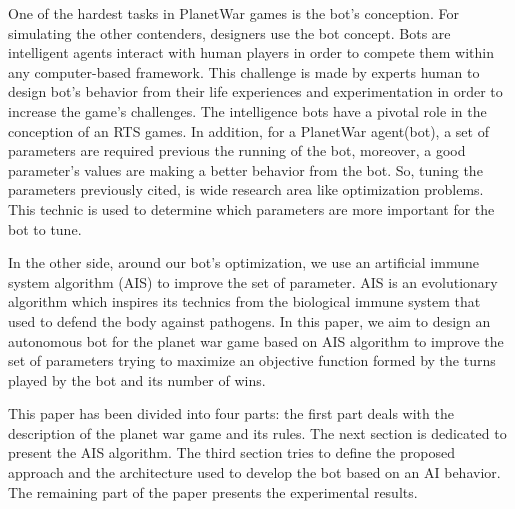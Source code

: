 \documentclass[conference]{IEEEtran}
\begin{document}
One of the hardest tasks in PlanetWar games is the bot's conception. For simulating the other contenders, designers use the bot concept. Bots are intelligent agents interact with human players in order to compete them within any computer-based framework\cite{doc4}. This challenge is made by experts human to design bot's behavior from their life experiences and experimentation in order to increase the game's challenges\cite{doc3}. The intelligence bots have a pivotal role\cite{doc4} in the conception of an RTS games. In addition, for a PlanetWar agent(bot), a set of parameters are required previous the running of the bot, moreover, a good parameter's values are making a better behavior from the bot. So, tuning the parameters previously cited, is wide research area like optimization problems\cite{doc1}. This technic is used to determine which parameters are more important for the bot to tune\cite{doc1}. 

In the other side, around our bot's optimization, we use an artificial immune system algorithm (AIS) to improve the set of parameter. AIS is an evolutionary algorithm which inspires its technics from the biological immune system that used to defend the body against pathogens. In this paper, we aim to design an autonomous bot for the planet war game based on AIS algorithm to improve the set of parameters trying to maximize an objective function formed by the turns played by the bot and its number of wins. 

This paper has been divided into four parts: the first part deals with the description of the planet war game and its rules. The next section is dedicated to present the AIS algorithm. The third section tries to define the proposed approach and the architecture used to develop the bot based on an AI behavior. The remaining part of the paper presents the experimental results.         


 
\end{document}
